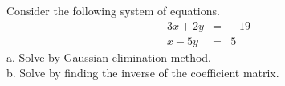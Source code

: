 \documentclass{ximera}
\begin{document}
\begin{exercise}
Consider the following system of equations. 
\begin{eqnarray*}
3x+ 2y&=& -19\\
x-5y &=& 5
\end{eqnarray*}
a. Solve by Gaussian elimination method. \\
b. Solve by finding the inverse of the coefficient matrix. 
\end{exercise} 
\end{document}
